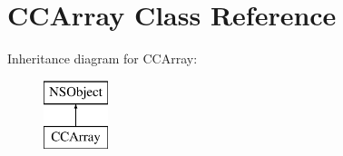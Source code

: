 \hypertarget{interface_c_c_array}{\section{C\-C\-Array Class Reference}
\label{interface_c_c_array}
}
Inheritance diagram for C\-C\-Array\-:\begin{figure}[H]
\begin{center}
\leavevmode
\includegraphics[height=2.000000cm]{interface_c_c_array}
\end{center}
\end{figure}
